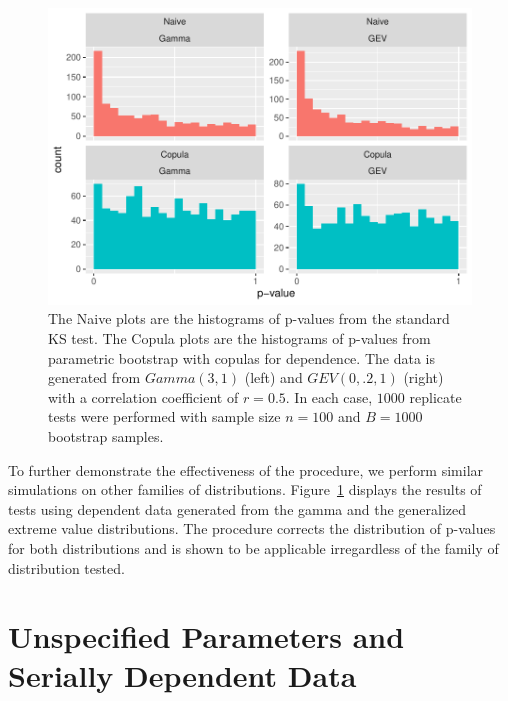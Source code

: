 \documentclass[12pt, letterpaper, titlepage]{article}
\begin{document}
\begin{figure}[tbp]
  \centering
  \includegraphics[width=\textwidth]{hist_gamma_gev_D}
  \caption{The Naive plots are the histograms of p-values from the standard KS 
  test. The Copula plots are the histograms of p-values from parametric 
  bootstrap with copulas for dependence. The data is generated from $Gamma(3, 
  1)$ (left) and $GEV(0, .2, 1)$ (right) with a correlation coefficient of $r = 
  0.5$. In each case, $1000$ replicate tests were performed with sample size $n 
  = 100$ and $B = 1000$ bootstrap samples.}
  \label{fig:hist_gamma_gev_D}
\end{figure}


To further demonstrate the effectiveness of the procedure, we perform similar 
simulations on other families of distributions. 
Figure~\ref{fig:hist_gamma_gev_D} displays the results of tests using dependent 
data generated from the gamma and the generalized extreme value distributions.
The procedure corrects the distribution of p-values for both distributions and 
is shown to be applicable irregardless of the family of distribution tested.

\section{Unspecified Parameters and Serially Dependent Data}
\label{sec:fittedwithdependence}
\end{document}
